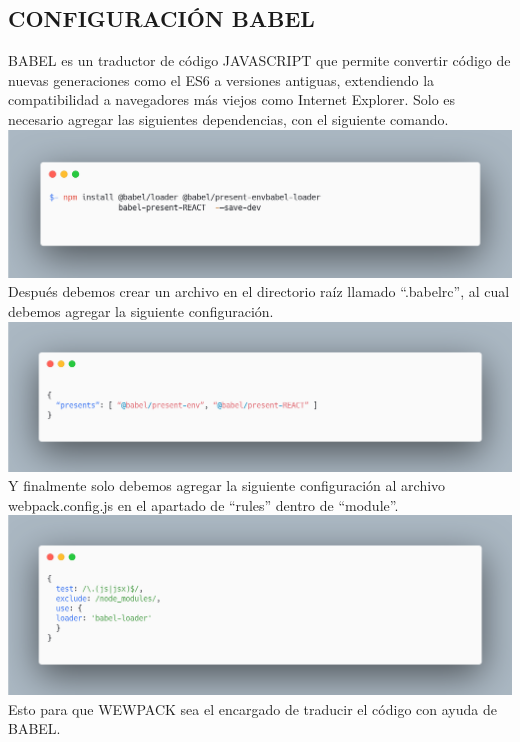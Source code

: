 \subsection{CONFIGURACIÓN BABEL}
BABEL es un traductor de código JAVASCRIPT que permite convertir código de nuevas generaciones como el ES6 a versiones antiguas, extendiendo la compatibilidad a navegadores más viejos como Internet Explorer.
Solo es necesario agregar las siguientes dependencias, con el siguiente comando.
\newline
\newline
\includegraphics[width=1\textwidth]{./Imagenes/image36.png}
\newline
Después debemos crear un archivo en el directorio raíz llamado “.babelrc”, al cual debemos agregar la siguiente configuración.
\newline
\newline
\includegraphics[width=1\textwidth]{./Imagenes/image17.png}
\newline
Y finalmente solo debemos agregar la siguiente configuración al archivo webpack.config.js en el apartado de “rules” dentro de “module”.
\newline
\newline
\includegraphics[width=1\textwidth]{./Imagenes/image1.png}
\newline
Esto para que WEWPACK sea el encargado de traducir el código con ayuda de BABEL.


